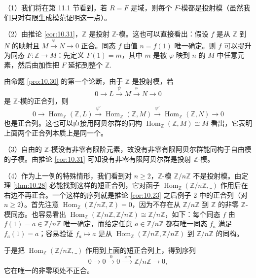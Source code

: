 \begin{example}
（1）我们将在第 11.1 节看到，若 \(R = F\) 是域，则每个 \(F\)-模都是投射模（虽然我们只对有限生成模范证明这一点）。

（2）由推论 \ref{cor:10.31}，\(\mathbb{Z}\) 是投射 \(\mathbb{Z}\)-模。这也可以直接看出：假设 \(f\) 是从 \(\mathbb{Z}\) 到 \(N\) 的映射且 \(M \xrightarrow{\varphi} N \to 0\) 正合。同态 \(f\) 由值 \(n = f(1)\) 唯一确定。则 \(f\) 可以提升为同态 \(F : \mathbb{Z} \to M\)：先定义 \(F(1) = m\)，其中 \(m\) 是被 \(\varphi\) 映到 \(n\) 的 \(M\) 中任意元素，然后由加性把 \(F\) 延拓到整个 \(\mathbb{Z}\).

由命题 \ref{pro:10.30} 的第一个论断，由于 \(\mathbb{Z}\) 是投射模，若
\[
0 \longrightarrow L \xrightarrow{\ \psi\ } M \xrightarrow{\ \varphi\ } N \longrightarrow 0
\]
是 \(\mathbb{Z}\)-模的正合列，则
\[
0 \longrightarrow \operatorname{Hom}_{\mathbb{Z}}(\mathbb{Z}, L) \xrightarrow{\ \psi'\ } \operatorname{Hom}_{\mathbb{Z}}(\mathbb{Z}, M) \xrightarrow{\ \varphi'\ } \operatorname{Hom}_{\mathbb{Z}}(\mathbb{Z}, N) \longrightarrow 0
\]
也是正合列。这也可以直接用阿贝尔群的同构 \(\operatorname{Hom}_{\mathbb{Z}}(\mathbb{Z}, M) \cong M\) 看出，它表明上面两个正合列本质上是同一个。

（3）自由的 \(\mathbb{Z}\)-模没有非零有限阶元素，故没有非零有限阿贝尔群能同构于自由模的子模。由推论 \ref{cor:10.31} 可知没有非零有限阿贝尔群是投射 \(\mathbb{Z}\)-模。

（4）作为上一例的特殊情形，我们看到对 \(n \geq 2\)，\(\mathbb{Z}\)-模 \(\mathbb{Z}/n\mathbb{Z}\) 不是投射模。由定理 \ref{thm:10.28} 必能找到这样的短正合列，它对函子 \(\operatorname{Hom}_{\mathbb{Z}}(\mathbb{Z}/n\mathbb{Z}, \_)\) 作用后在右边不再正合。一个这样的序列就是推论 \ref{cor:10.23} 之后例子 2 中的正合列（对 \(n \geq 2\)）。首先注意 \(\operatorname{Hom}_{\mathbb{Z}}(\mathbb{Z}/n\mathbb{Z}, \mathbb{Z}) = 0\)，因为不存在从 \(\mathbb{Z}/n\mathbb{Z}\) 到 \(\mathbb{Z}\) 的非零 \(\mathbb{Z}\)-模同态。也容易看出 \(\operatorname{Hom}_{\mathbb{Z}}(\mathbb{Z}/n\mathbb{Z}, \mathbb{Z}/n\mathbb{Z}) \cong \mathbb{Z}/n\mathbb{Z}\)，如下：每个同态 \(f\) 由 \(f(1) = a \in \mathbb{Z}/n\mathbb{Z}\) 唯一确定，而给定任意 \(a \in \mathbb{Z}/n\mathbb{Z}\) 都有唯一同态 \(f_a\) 满足 \(f_a(1) = a\)；容易验证 \(f_a \mapsto a\) 是从 \(\operatorname{Hom}_{\mathbb{Z}}(\mathbb{Z}/n\mathbb{Z}, \mathbb{Z}/n\mathbb{Z})\) 到 \(\mathbb{Z}/n\mathbb{Z}\) 的同构。

于是把 \(\operatorname{Hom}_{\mathbb{Z}}(\mathbb{Z}/n\mathbb{Z}, \_)\) 作用到上面的短正合列上，得到序列
\[
0 \longrightarrow 0 \xrightarrow{\ 0\ } 0 \xrightarrow{\ \times n\ } \mathbb{Z}/n\mathbb{Z} \xrightarrow{\ \ } 0,
\]
它在唯一的非零项处不正合。


\end{example}

